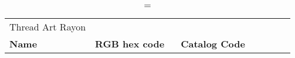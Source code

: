 
\begin{longtable}{p{0.3\linewidth} p{0.3\linewidth} p{0.4\linewidth}}
\caption = {Thread Art Rayon}
\label{tblr:threadartrayon}\\
\textbf{Name} & \textbf{RGB hex code} & \textbf{Catalog Code} \\

\end{longtable}
